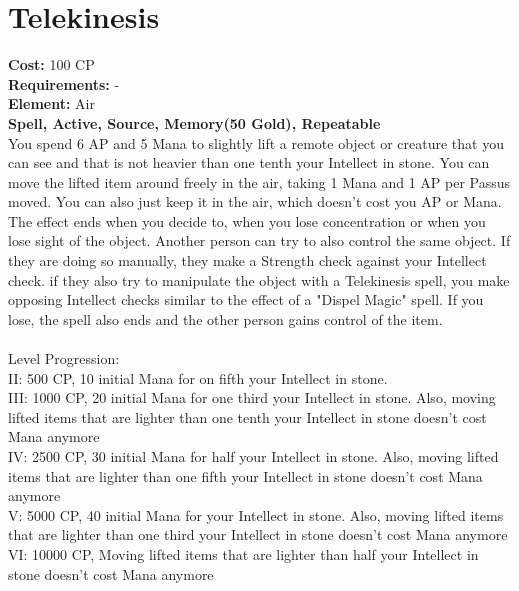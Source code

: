 \section{Telekinesis}
\textbf{Cost:} 100 CP\\
\textbf{Requirements:} -\\
\textbf{Element:} Air\\
\textbf{Spell, Active, Source, Memory(50 Gold), Repeatable}\\
You spend 6 AP and 5 Mana to slightly lift a remote object or creature that you can see and that is not heavier than one tenth your Intellect in stone. You can move the lifted item around freely in the air, taking 1 Mana and 1 AP per Passus moved. You can also just keep it in the air, which doesn't cost you AP or Mana.\\
The effect ends when you decide to, when you lose concentration or when you lose sight of the object. Another person can try to also control the same object. If they are doing so manually, they make a Strength check against your Intellect check. if they also try to manipulate the object with a Telekinesis spell, you make opposing Intellect checks similar to the effect of a "Dispel Magic" spell. If you lose, the spell also ends and the other person gains control of the item.\\
\\
Level Progression:\\
II: 500 CP, 10 initial Mana for on fifth your Intellect in stone.\\
III: 1000 CP, 20 initial Mana for one third your Intellect in stone. Also, moving lifted items that are lighter than one tenth your Intellect in stone doesn't cost Mana anymore\\
IV: 2500 CP, 30 initial Mana for half your Intellect in stone. Also, moving lifted items that are lighter than one fifth your Intellect in stone doesn't cost Mana anymore\\
V: 5000 CP, 40 initial Mana for your Intellect in stone. Also, moving lifted items that are lighter than one third your Intellect in stone doesn't cost Mana anymore\\
VI: 10000 CP, Moving lifted items that are lighter than half your Intellect in stone doesn't cost Mana anymore\\